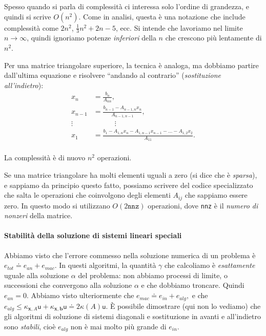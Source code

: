 \documentclass[a4paper]{report}
\theoremstyle{definiton}
\theoremstyle{remark}
\newcommand{\x}{\mathbf{x}}
\renewcommand{\b}{\mathbf{b}}
\begin{document}
Spesso quando si parla di complessità ci interessa solo l'ordine di grandezza, e quindi si scrive $O(n^2)$. Come in analisi, questa è una notazione che include complessità come $2n^2$, $\frac{1}{3}n^2 + 2n - 5$, ecc. Si intende che lavoriamo nel limite $n\to \infty$, quindi ignoriamo potenze \emph{inferiori} della $n$ che crescono più lentamente di $n^2$. 

Per una matrice triangolare superiore, la tecnica è analoga, ma dobbiamo partire dall'ultima equazione e risolvere ``andando al contrario'' (\emph{sostituzione all'indietro}):
\begin{align*}
x_n &= \frac{b_n}{A_{nn}},\\
x_{n-1} &= \frac{b_{n-1} - A_{n-1,n}x_n}{A_{n-1,n-1}},\\
\vdots & \quad \quad \quad \vdots\\
x_1 &= \frac{b_1 - A_{1,n}x_n - A_{1,n-1}x_{n-1} - \dots -A_{1,2}x_{2}}{A_{11}}.\\
\end{align*}

La complessità è di nuovo $n^2$ operazioni.

Se una matrice triangolare ha molti elementi uguali a zero (si dice che è \emph{sparsa}), e sappiamo da principio questo fatto, possiamo scrivere del codice specializzato che salta le operazioni che coinvolgono degli elementi $A_{ij}$ che sappiamo essere zero. In questo modo si utilizzano $O(2\texttt{nnz})$ operazioni, dove \texttt{nnz} è il \emph{numero di nonzeri} della matrice.

\paragraph{Stabilità della soluzione di sistemi lineari speciali} Abbiamo visto che l'errore commesso nella soluzione numerica di un problema è $e_{tot} \doteq e_{an} + e_{mac}$. In questi algoritmi, la quantità $\gamma$ che calcoliamo è \emph{esattamente} uguale alla soluzione $\alpha$ del problema: non abbiamo processi di limite, o successioni che convergono alla soluzione $\alpha$ e che dobbiamo troncare. Quindi $e_{an} = 0$. Abbiamo visto ulteriormente che 
$e_{mac} \doteq e_{in} + e_{alg},$ e che $e_{alg} \leq \kappa_{\x,A}\mathsf{u} + \kappa_{\x,\b} \mathsf{u} \doteq 2\kappa(A)\mathsf{u}$. È possibile dimostrare (qui non lo vediamo) che gli algoritmi di soluzione di sistemi diagonali e sostituzione in avanti e all'indietro sono \emph{stabili}, cioè $e_{alg}$ non è mai molto più grande di $e_{in}$.
\end{document}
